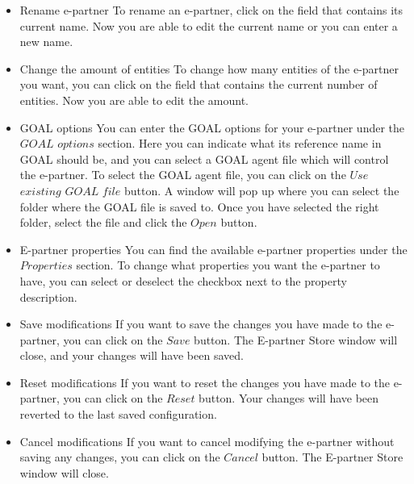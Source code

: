 \documentclass[11pt,a4paper]{article}
\begin{document}
\begin{itemize}
\item{Rename e-partner}
To rename an e-partner, click on the field that contains its current name. Now you are able to edit the current name or you can enter a new name.

\item{Change the amount of entities}
To change how many entities of the e-partner you want, you can click on the field that contains the current number of entities. Now you are able to edit the amount.

\item{GOAL options}
You can enter the GOAL options for your e-partner under the $GOAL$ $options$ section. Here you can indicate what its reference name in GOAL should be, and you can select a GOAL agent file which will control the e-partner. To select the GOAL agent file, you can click on the $Use$ $existing$ $GOAL$ $file$ button. A window will pop up where you can select the folder where the GOAL file is saved to. Once you have selected the right folder, select the file and click the $Open$ button.

\item{E-partner properties}
You can find the available e-partner properties under the $Properties$ section. To change what properties you want the e-partner to have, you can select or deselect the checkbox next to the property description.

\item{Save modifications}
If you want to save the changes you have made to the e-partner, you can click on the $Save$ button. The E-partner Store window will close, and your changes will have been saved.

\item{Reset modifications}
If you want to reset the changes you have made to the e-partner, you can click on the $Reset$ button. Your changes will have been reverted to the last saved configuration.

\item{Cancel modifications}
If you want to cancel modifying the e-partner without saving any changes, you can click on the $Cancel$ button. The E-partner Store window will close.

\end{itemize}
\end{document}
